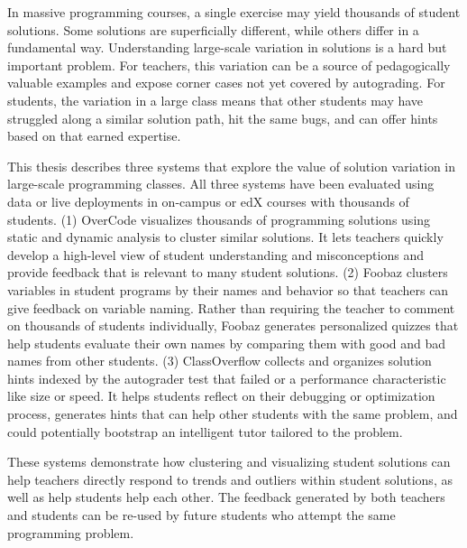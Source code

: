 %
%
%

In massive programming courses, a single exercise may yield thousands of student solutions. Some solutions are superficially different, while others differ in a fundamental way. Understanding large-scale variation in solutions is a hard but important problem. For teachers, this variation can be a source of pedagogically valuable examples and expose corner cases not yet covered by autograding. For students, the variation in a large class means that other students may have struggled along a similar solution path, hit the same bugs, and can offer hints based on that earned expertise.

This thesis describes three systems that explore the value of solution variation in large-scale programming classes. All three systems have been evaluated using data or live deployments in on-campus or edX courses with thousands of students. (1) OverCode visualizes thousands of programming solutions using static and dynamic analysis to cluster similar solutions. It lets teachers quickly develop a high-level view of student understanding and misconceptions and provide feedback that is relevant to many student solutions. (2) Foobaz clusters variables in student programs by their names and behavior so that teachers can give feedback on variable naming. Rather than requiring the teacher to comment on thousands of students individually, Foobaz generates personalized quizzes that help students evaluate their own names by comparing them with good and bad names from other students. (3) ClassOverflow collects and organizes solution hints indexed by the autograder test that failed or a performance characteristic like size or speed. It helps students reflect on their debugging or optimization process, generates hints that can help other students with the same problem, and could potentially bootstrap an intelligent tutor tailored to the problem.

These systems demonstrate how clustering and visualizing student solutions can help teachers directly respond to trends and outliers within student solutions, as well as help students help each other. The feedback generated by both teachers and students can be re-used by future students who attempt the same programming problem.

